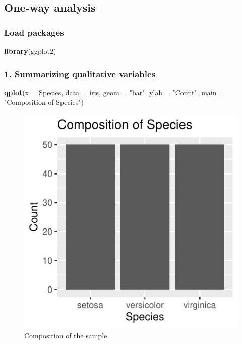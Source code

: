 \documentclass[]{article}
\newenvironment{Shaded}{\begin{snugshade}}{\end{snugshade}}
\newcommand{\DataTypeTok}[1]{\textcolor[rgb]{0.13,0.29,0.53}{#1}}
\newcommand{\KeywordTok}[1]{\textcolor[rgb]{0.13,0.29,0.53}{\textbf{#1}}}
\newcommand{\NormalTok}[1]{#1}
\newcommand{\StringTok}[1]{\textcolor[rgb]{0.31,0.60,0.02}{#1}}
\begin{document}
\newpage

\hypertarget{one-way-analysis}{%
\subsection{One-way analysis}\label{one-way-analysis}}

\hypertarget{load-packages}{%
\subsubsection{Load packages}\label{load-packages}}

\begin{Shaded}
\begin{Highlighting}[]
\KeywordTok{library}\NormalTok{(ggplot2)}
\end{Highlighting}
\end{Shaded}

\hypertarget{summarizing-qualitative-variables}{%
\subsubsection{1. Summarizing qualitative
variables}\label{summarizing-qualitative-variables}}

\begin{Shaded}
\begin{Highlighting}[]
\KeywordTok{qplot}\NormalTok{(}\DataTypeTok{x =}\NormalTok{ Species, }\DataTypeTok{data =}\NormalTok{ iris, }\DataTypeTok{geom =} \StringTok{"bar"}\NormalTok{, }\DataTypeTok{ylab =} \StringTok{"Count"}\NormalTok{,}
      \DataTypeTok{main =} \StringTok{"Composition of Species"}\NormalTok{)}
\end{Highlighting}
\end{Shaded}

\begin{figure}
\centering
\includegraphics{Week3Answers_files/figure-latex/unnamed-chunk-4-1.pdf}
\caption{Composition of the sample}
\end{figure}
\end{document}
